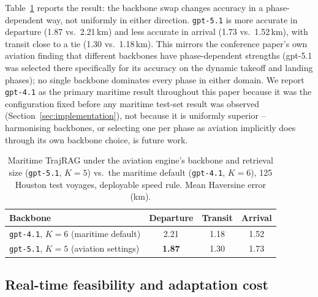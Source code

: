 Table~\ref{tab:maritime-backbone} reports the result: the backbone swap
changes accuracy in a phase-dependent way, not uniformly in either
direction. \texttt{gpt-5.1} is more accurate in departure (1.87 vs.\
2.21\,km) and less accurate in arrival (1.73 vs.\ 1.52\,km), with transit
close to a tie (1.30 vs.\ 1.18\,km). This mirrors the conference paper's
own aviation finding that different backbones have phase-dependent
strengths (gpt-5.1 was selected there specifically for its accuracy on the
dynamic takeoff and landing phases); no single backbone dominates every
phase in either domain. We report \texttt{gpt-4.1} as the primary maritime
result throughout this paper because it was the configuration fixed before
any maritime test-set result was observed (Section~\ref{sec:implementation}),
not because it is uniformly superior -- harmonising backbones, or selecting
one per phase as aviation implicitly does through its own backbone choice,
is future work.

\begin{table}[t]
\centering
\caption{Maritime TrajRAG under the aviation engine's backbone and
retrieval size (\texttt{gpt-5.1}, $K=5$) vs.\ the maritime default
(\texttt{gpt-4.1}, $K=6$), 125 Houston test voyages, deployable speed rule.
Mean Haversine error (km).}
\label{tab:maritime-backbone}
\footnotesize
\begin{tabular}{lccc}
\toprule
Backbone & Departure & Transit & Arrival \\
\midrule
\texttt{gpt-4.1}, $K=6$ (maritime default) & 2.21 & 1.18 & 1.52 \\
\texttt{gpt-5.1}, $K=5$ (aviation settings) & \textbf{1.87} & 1.30 & 1.73 \\
\bottomrule
\end{tabular}
\end{table}

\subsection{Real-time feasibility and adaptation cost}
\label{sec:latency}

